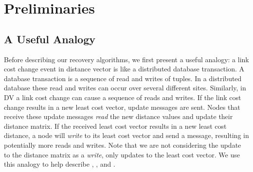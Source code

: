 \section{Preliminaries}
\label{sec:prelim}





\subsection{A Useful Analogy}
\label{subsec:analogy}
Before describing our recovery algorithms, we first present a useful analogy: a link cost change event in distance vector is like a distributed 
database transaction. A database transaction is a sequence of read and writes of tuples. In a distributed database these read and writes can occur over several 
different sites. Similarly, in DV a link cost change can cause a sequence of reads and writes. If the link cost change
results in a new least cost vector, update messages are sent.  Nodes that receive these update messages  \emph{read} the new distance values and update their 
distance matrix. If the received least cost vector results in a new least cost distance, a node will \emph{write} to its least cost vector and send a message, 
resulting in potentially more reads and writes. Note that we are not considering the update to the distance matrix as a \emph{write}, only
updates to the least cost vector. We use this analogy to help describe \second, \purge, and \cpr.

